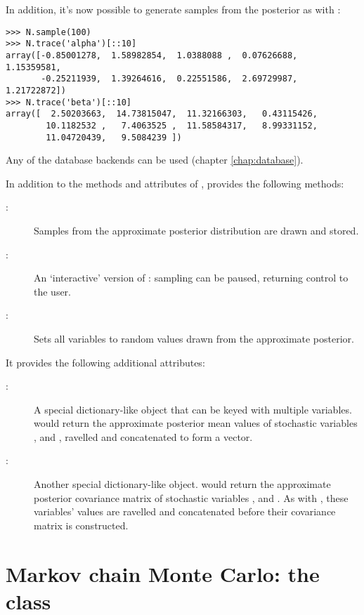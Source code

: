 In addition, it's now possible to generate samples from the posterior as with :
\begin{verbatim}
>>> N.sample(100)
>>> N.trace('alpha')[::10]
array([-0.85001278,  1.58982854,  1.0388088 ,  0.07626688,  1.15359581,
       -0.25211939,  1.39264616,  0.22551586,  2.69729987,  1.21722872])
>>> N.trace('beta')[::10]
array([  2.50203663,  14.73815047,  11.32166303,   0.43115426,
        10.1182532 ,   7.4063525 ,  11.58584317,   8.99331152,
        11.04720439,   9.5084239 ])
\end{verbatim}
Any of the database backends can be used (chapter \ref{chap:database}).  

\bigskip
In addition to the methods and attributes of ,  provides the following methods:
\begin{description}
    \item[:] Samples from the approximate posterior distribution are drawn and stored.
    \item[:] An `interactive' version of : sampling can be paused, returning control to the user.
    \item[:] Sets all variables to random values drawn from the approximate posterior.
\end{description}
It provides the following additional attributes:
\begin{description}
    \item[:] A special dictionary-like object that can be keyed with multiple variables.  would return the approximate posterior mean values of stochastic variables ,  and , ravelled and concatenated to form a vector.
    \item[:] Another special dictionary-like object.  would return the approximate posterior covariance matrix of stochastic variables ,  and . As with , these variables' values are ravelled and concatenated before their covariance matrix is constructed.
\end{description}

\hypertarget{mcmc}{}
\section[Markov chain Monte Carlo: the MCMC class]{Markov chain Monte
Carlo: the  class} \label{sec:mcmc}

